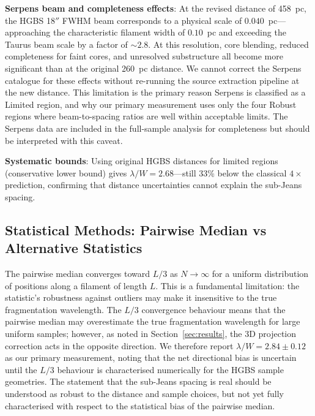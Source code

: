 \documentclass[twoside,twocolumn]{mnras}
\begin{document}
\textbf{Serpens beam and completeness effects}: At the revised distance of 458~pc,
the HGBS 18$''$ FWHM beam corresponds to a physical scale of $0.040$~pc---approaching
the characteristic filament width of $0.10$~pc and exceeding the Taurus beam scale by
a factor of $\sim 2.8$. At this resolution, core blending, reduced completeness for
faint cores, and unresolved substructure all become more significant than at the
original 260~pc distance. We cannot correct the Serpens catalogue for these effects
without re-running the source extraction pipeline at the new distance. This limitation
is the primary reason Serpens is classified as a Limited region, and why our primary
measurement uses only the four Robust regions where beam-to-spacing ratios are well
within acceptable limits. The Serpens data are included in the full-sample analysis for
completeness but should be interpreted with this caveat.

\textbf{Systematic bounds}: Using original HGBS distances for limited regions
(conservative lower bound) gives $\lambda/W = 2.68$---still 33\% below the classical
$4\times$ prediction, confirming that distance uncertainties cannot explain the
sub-Jeans spacing.

\subsection{Statistical Methods: Pairwise Median vs Alternative Statistics}
\label{sec:statistics}

The pairwise median converges toward $L/3$ as $N \to \infty$ for a uniform distribution
of positions along a filament of length $L$. This is a fundamental limitation: the
statistic's robustness against outliers may make it insensitive to the true fragmentation
wavelength. The $L/3$ convergence behaviour means that the pairwise median may overestimate the true
fragmentation wavelength for large uniform samples; however, as noted in
Section~\ref{sec:results}, the 3D projection correction acts in the opposite direction.
We therefore report $\lambda/W = 2.84 \pm 0.12$ as our primary measurement, noting
that the net directional bias is uncertain until the $L/3$ behaviour is characterised
numerically for the HGBS sample geometries. The statement that the sub-Jeans spacing
is real should be understood as robust to the distance and sample choices, but not
yet fully characterised with respect to the statistical bias of the pairwise median.
\end{document}
